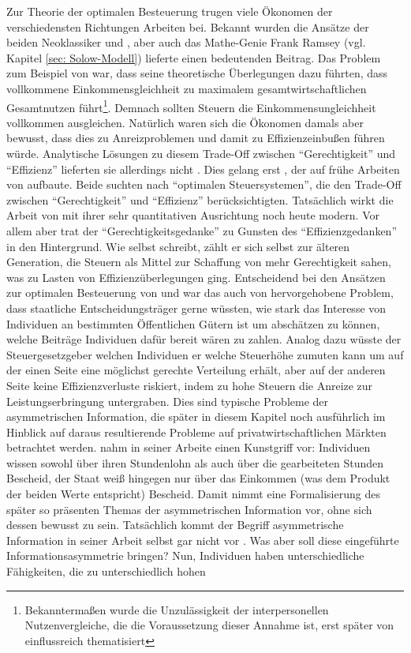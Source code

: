 Zur Theorie der optimalen Besteuerung trugen viele Ökonomen der verschiedensten Richtungen Arbeiten bei. Bekannt wurden die Ansätze der beiden Neoklassiker \textcite{Edgeworth1897} und \textcite{Pigou1920}, aber auch das Mathe-Genie Frank Ramsey (vgl. Kapitel \ref{sec: Solow-Modell}) lieferte einen bedeutenden Beitrag. Das Problem zum Beispiel von \textcite{Pigou1920} war, dass seine theoretische Überlegungen dazu führten, dass vollkommene Einkommensgleichheit zu maximalem gesamtwirtschaftlichen Gesamtnutzen führt\footnote{Bekanntermaßen wurde die Unzulässigkeit der interpersonellen Nutzenvergleiche, die die Voraussetzung dieser Annahme ist, erst später von \textcite{Robbins1932} einflussreich thematisiert}. Demnach sollten Steuern die Einkommensungleichheit vollkommen ausgleichen. Natürlich waren sich die Ökonomen damals aber bewusst, dass dies zu Anreizproblemen und damit zu Effizienzeinbußen führen würde. Analytische Lösungen zu diesem Trade-Off zwischen "`Gerechtigkeit"' und "`Effizienz"' lieferten sie allerdings nicht \parencite[S. 168]{Sandmo1999}. Dies gelang erst \textcite{Mirrlees1971}, der auf frühe Arbeiten von \textcite{Vickrey1945, Vickrey1947} aufbaute. Beide suchten nach "`optimalen Steuersystemen"', die den Trade-Off zwischen "`Gerechtigkeit"' und "`Effizienz"' berücksichtigten. Tatsächlich wirkt die Arbeit von \textcite{Mirrlees1971} mit ihrer sehr quantitativen Ausrichtung noch heute modern. Vor allem aber trat der "`Gerechtigkeitsgedanke"' zu Gunsten des "`Effizienzgedanken"' in den Hintergrund. Wie \textcite[S. 35]{Musgrave1981} selbst schreibt, zählt er sich selbst zur älteren Generation, die Steuern als Mittel zur Schaffung von mehr Gerechtigkeit sahen, was zu Lasten von Effizienzüberlegungen ging. Entscheidend bei den Ansätzen zur optimalen Besteuerung von \textcite{Vickrey1947} und \textcite{Mirrlees1971} war das auch von \textcite{Samuelson1954} hervorgehobene Problem, dass staatliche Entscheidungsträger gerne wüssten, wie stark das Interesse von Individuen an bestimmten Öffentlichen Gütern ist um abschätzen zu können, welche Beiträge Individuen dafür bereit wären zu zahlen. Analog dazu wüsste der Steuergesetzgeber welchen Individuen er welche Steuerhöhe zumuten kann um auf der einen Seite eine möglichst gerechte Verteilung erhält, aber auf der anderen Seite keine Effizienzverluste riskiert, indem zu hohe Steuern die Anreize zur Leistungserbringung untergraben. Dies sind typische Probleme der asymmetrischen Information, die später in diesem Kapitel noch ausführlich im Hinblick auf daraus resultierende Probleme auf privatwirtschaftlichen Märkten betrachtet werden. \textcite{Mirrlees1971} nahm in seiner Arbeite einen Kunstgriff vor: Individuen wissen sowohl über ihren Stundenlohn als auch über die gearbeiteten Stunden Bescheid, der Staat weiß hingegen nur über das Einkommen (was dem Produkt der beiden Werte entspricht) Bescheid. Damit nimmt \textcite{Mirrlees1971} eine Formalisierung des später so präsenten Themas der asymmetrischen Information vor, ohne sich dessen bewusst zu sein. Tatsächlich kommt der Begriff asymmetrische Information in seiner Arbeit selbst gar nicht vor \parencite[S. 170]{Mirrlees1971}. Was aber soll diese eingeführte Informationsasymmetrie bringen? Nun, Individuen haben unterschiedliche Fähigkeiten, die zu unterschiedlich hohen 